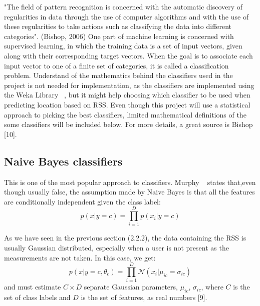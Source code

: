 "The field of pattern recognition is concerned with the automatic discovery of regularities in data through the use of computer algorithms and with the use of these regularities to take actions such as classifying the data into different categories". (Bishop, 2006)
One part of machine learning is concerned with supervised learning, in which the training data is a set of input vectors, given along with their corresponding target vectors. When the goal is to associate each input vector to one of a finite set of categories, it is called a classification problem. Understand of the mathematics behind the classifiers used in the project is not needed for implementation, as the classifiers are implemented using the Weka Library ~\cite{Weka}, but it might help choosing which classifier to be used when predicting location based on RSS. Even though this project will use a statistical approach to picking the best classifiers, limited mathematical definitions of the some classifiers will be included below. For more details, a great source is Bishop [10].

\subsection{Naive Bayes classifiers}
This is one of the most popular approach to classifiers. Murphy ~\cite{Murphy} states that,even though usually false, the assumption made by Naive Bayes is that all the features are conditionally independent given the class label:
$$ p(x|y = c) = \prod\limits_{i=1}^D p(x_i|y = c) $$

As we have seen in the previous section (2.2.2), the data containing the RSS is usually Gaussian distributed, especially when a user is not present as the measurements are not taken. In this case, we get:
$$ p(x|y = c,\theta_c) = \prod\limits_{i=1}^D \mathcal{N}(x_i|\mu_{ic} = \sigma_{ic}) $$ and must estimate $C \times D$ separate Gaussian parameters, $\mu_{ic}$, $\sigma_{ic}$, where $C$ is the set of class labels and $D$ is the set of features, as real numbers [9].

